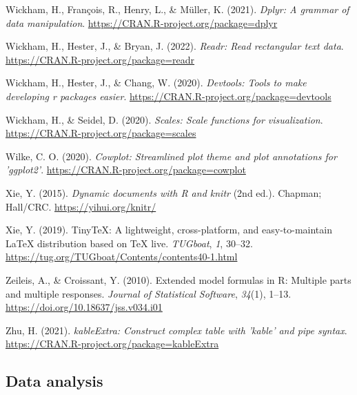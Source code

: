 \documentclass[
  man,floatsintext]{apa7}
\newlength{\cslhangindent}
\newlength{\cslentryspacingunit} %
\newenvironment{CSLReferences}[2] %
 {%
  \setlength{\parindent}{0pt}
  \ifodd #1
  \let\oldpar\par
  \def\par{\hangindent=\cslhangindent\oldpar}
  \fi
  \setlength{\parskip}{#2\cslentryspacingunit}
 }%
 {}
\begin{document}
\begin{CSLReferences}{1}{0}
\leavevmode{}%
Wickham, H., François, R., Henry, L., \& Müller, K. (2021). \emph{Dplyr: A grammar of data manipulation}. \url{https://CRAN.R-project.org/package=dplyr}

\leavevmode{}%
Wickham, H., Hester, J., \& Bryan, J. (2022). \emph{Readr: Read rectangular text data}. \url{https://CRAN.R-project.org/package=readr}

\leavevmode{}%
Wickham, H., Hester, J., \& Chang, W. (2020). \emph{Devtools: Tools to make developing r packages easier}. \url{https://CRAN.R-project.org/package=devtools}

\leavevmode{}%
Wickham, H., \& Seidel, D. (2020). \emph{Scales: Scale functions for visualization}. \url{https://CRAN.R-project.org/package=scales}

\leavevmode{}%
Wilke, C. O. (2020). \emph{Cowplot: Streamlined plot theme and plot annotations for 'ggplot2'}. \url{https://CRAN.R-project.org/package=cowplot}

\leavevmode{}%
Xie, Y. (2015). \emph{Dynamic documents with {R} and knitr} (2nd ed.). Chapman; Hall/CRC. \url{https://yihui.org/knitr/}

\leavevmode{}%
Xie, Y. (2019). TinyTeX: A lightweight, cross-platform, and easy-to-maintain LaTeX distribution based on TeX live. \emph{TUGboat}, \emph{1}, 30--32. \url{https://tug.org/TUGboat/Contents/contents40-1.html}

\leavevmode{}%
Zeileis, A., \& Croissant, Y. (2010). Extended model formulas in {R}: Multiple parts and multiple responses. \emph{Journal of Statistical Software}, \emph{34}(1), 1--13. \url{https://doi.org/10.18637/jss.v034.i01}

\leavevmode{}%
Zhu, H. (2021). \emph{kableExtra: Construct complex table with 'kable' and pipe syntax}. \url{https://CRAN.R-project.org/package=kableExtra}

\end{CSLReferences}

\endgroup

\hypertarget{data-analysis}{%
\subsection{Data analysis}\label{data-analysis}}
\end{document}
